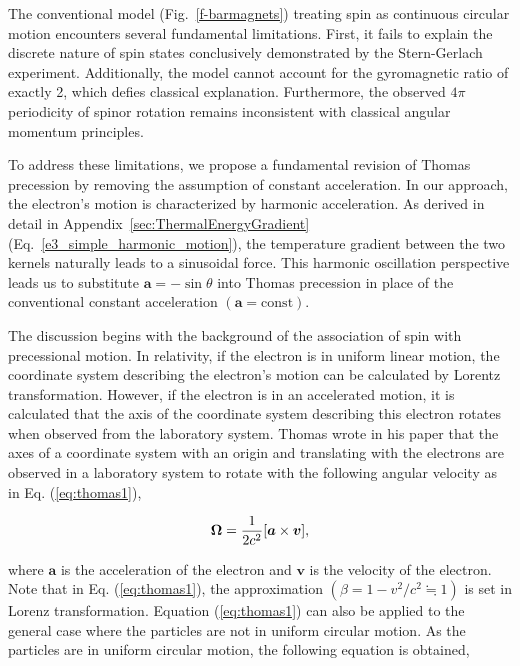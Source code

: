 \documentclass[%
 reprint,
 amsmath,amssymb,
 aps,
]{revtex4-1}
\numberwithin{equation}{section}%
\begin{document}
The conventional model (Fig.~\ref{f-barmagnets}) treating spin as continuous circular motion encounters several fundamental limitations. First, it fails to explain the discrete nature of spin states conclusively demonstrated by the Stern-Gerlach experiment. Additionally, the model cannot account for the gyromagnetic ratio of exactly 2, which defies classical explanation. Furthermore, the observed $4\pi$ periodicity of spinor rotation remains inconsistent with classical angular momentum principles.

To address these limitations, we propose a fundamental revision of Thomas precession by removing the assumption of constant acceleration. In our approach, the electron's motion is characterized by harmonic acceleration. As derived in detail in Appendix~\ref{sec:ThermalEnergyGradient} (Eq.~\ref{e3_simple_harmonic_motion}), the temperature gradient between the two kernels naturally leads to a sinusoidal force. This harmonic oscillation perspective leads us to substitute ${\boldsymbol a} = -\sin\theta$ into Thomas precession in place of the conventional constant acceleration $({\boldsymbol a} = \text{const})$.


The discussion begins with the background of the association of spin with precessional motion. In relativity, if the electron is in uniform linear motion, the coordinate system describing the electron's motion can be calculated by Lorentz transformation. However, if the electron is in an accelerated motion, it is calculated that the axis of the coordinate system describing this electron rotates when observed from the laboratory system. Thomas wrote in his paper that the axes of a coordinate system with an origin and translating with the electrons are observed in a laboratory system to rotate with the following angular velocity as in Eq. (\ref{eq:thomas1}),

\begin{equation}
    {\bf \Omega}=\frac{1}{2 c^2}[{\boldsymbol a} \times {\boldsymbol v}],
    \label{eq:thomas1}
\end{equation}

\noindent where ${\boldsymbol a}$ is the acceleration of the electron and ${\boldsymbol v}$ is the velocity of the electron. Note that in Eq. (\ref{eq:thomas1}), the approximation $(\beta = 1 - v^2/c^2 \fallingdotseq 1)$ is set in Lorenz transformation. Equation (\ref{eq:thomas1}) can also be applied to the general case where the particles are not in uniform circular motion. As the particles are in uniform circular motion, the following equation is obtained,
\end{document}

